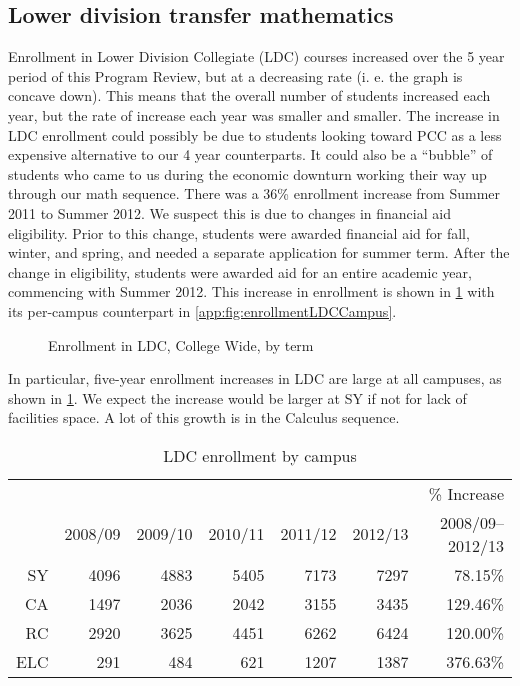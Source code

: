 \subsection{Lower division transfer mathematics}
Enrollment in Lower Division Collegiate (LDC) courses increased over the 5 year period of this Program Review, but at a decreasing rate (i.
e. the graph is
concave down).
This means that the overall number of students increased each year, but the rate of increase each year was smaller and smaller.
The increase in LDC enrollment could possibly be due to students looking toward PCC as a less expensive alternative to our 4 year counterparts.
It could also be a ``bubble'' of students who came to us during the economic downturn working their way up through our math sequence.
There was a 36\% enrollment increase from Summer 2011 to Summer 2012.
We suspect this is due to changes in financial aid eligibility.
Prior to this change, students were awarded financial aid for fall, winter, and spring, and needed a separate application for summer term.
After the change in eligibility, students were awarded aid for an entire academic year, commencing with Summer 2012.
This increase in enrollment is shown in \cref{needs:fig:enrollmentLDCTerm} with its per-campus counterpart in \vref{app:fig:enrollmentLDCCampus}.

\begin{figure}[!htb]
	\centering
	
	\caption{Enrollment in LDC, College Wide, by term}
	\label{needs:fig:enrollmentLDCTerm}
\end{figure}

In particular, five-year enrollment increases  in LDC are large at all campuses, as shown in \cref{needs:tab:LDCenrollmentCampus}.
We expect the increase would be larger at SY if not for lack of facilities space.
A lot of this growth is in the Calculus sequence.

\begin{table}[!htb]
	\centering
	\caption{LDC enrollment by campus}
	\label{needs:tab:LDCenrollmentCampus}
	\begin{tabular}{r*{6}{r}}
		\toprule
		    &         &         &         &         &         & \% Increase      \\
		    & 2008/09 & 2009/10 & 2010/11 & 2011/12 & 2012/13 & 2008/09--2012/13 \\
		\midrule
		SY  & 4096    & 4883    & 5405    & 7173    & 7297    & 78.15\%          \\
		CA  & 1497    & 2036    & 2042    & 3155    & 3435    & 129.46\%         \\
		RC  & 2920    & 3625    & 4451    & 6262    & 6424    & 120.00\%         \\
		ELC & 291     & 484     & 621     & 1207    & 1387    & 376.63\%         \\
		\bottomrule
	\end{tabular}
\end{table}

